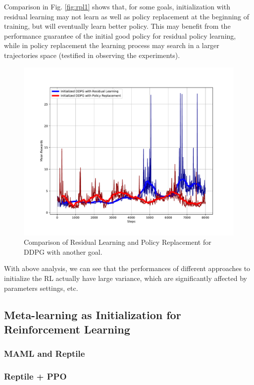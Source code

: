 \documentclass{article}
\begin{document}
Comparison in Fig. \ref{fig:rpl1} shows that, for some goals, initialization with residual learning may not learn as well as policy replacement at the beginning of training, but will eventually learn better policy. This may benefit from the performance guarantee of the initial good policy for residual policy learning, while in policy replacement the learning process may search in a larger trajectories space (testified in observing the experiments). 
\begin{figure}[htbp]
	\centering
	\includegraphics[scale=0.5]{img/res_ddpg2.pdf}
	\caption{Comparison of Residual Learning and Policy Replacement for DDPG with another goal.}
	\label{fig:rpl3}
\end{figure}

With above analysis, we can see that the performances of different approaches to initialize the RL actually have large variance, which are significantly affected by parameters settings, etc. 

\subsection{Meta-learning as Initialization for Reinforcement Learning}

\subsubsection{MAML and Reptile}

\subsubsection{Reptile + PPO}
\end{document}
